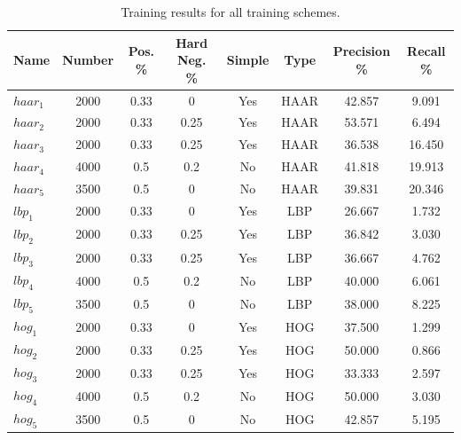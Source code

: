 \documentclass{llncs}
\begin{document}
{		\begin{table}
			\centering
			\caption{Training results for all training schemes.}
			\label{tab:training_results}
			\begin{tabularx}{\textwidth}{@{}lccccccc@{}}
				\toprule
				\textbf{Name} & \textbf{Number} & \textbf{Pos. \%} & \textbf{Hard Neg. \%} & \textbf{Simple} & \textbf{Type} & \textbf{Precision \%} & \textbf{Recall \%} \\
				\midrule
					\(haar_1\) & 2000 & 0.33 & 0     & Yes & HAAR & 42.857 &  9.091 \\
					\(haar_2\) & 2000 & 0.33 & 0.25  & Yes & HAAR & 53.571 &  6.494 \\
					\(haar_3\) & 2000 & 0.33 & 0.25  & Yes & HAAR & 36.538 & 16.450 \\
					\(haar_4\) & 4000 & 0.5  & 0.2   & No & HAAR & 41.818 & 19.913 \\
					\(haar_5\) & 3500 & 0.5  & 0     & No & HAAR & 39.831 & 20.346 \\
					\(lbp_1\)  & 2000 & 0.33 & 0     & Yes & LBP  & 26.667 &  1.732 \\
					\(lbp_2\)  & 2000 & 0.33 & 0.25  & Yes & LBP  & 36.842 &  3.030 \\
					\(lbp_3\)  & 2000 & 0.33 & 0.25  & Yes & LBP  & 36.667 &  4.762 \\
					\(lbp_4\)  & 4000 & 0.5  & 0.2   & No & LBP  & 40.000 &  6.061 \\
					\(lbp_5\)  & 3500 & 0.5  & 0     & No & LBP  & 38.000 &  8.225 \\
					\(hog_1\)  & 2000 & 0.33 & 0     & Yes & HOG  & 37.500 &  1.299 \\
					\(hog_2\)  & 2000 & 0.33 & 0.25  & Yes & HOG  & 50.000 &  0.866 \\
					\(hog_3\)  & 2000 & 0.33 & 0.25  & Yes & HOG  & 33.333 &  2.597 \\
					\(hog_4\)  & 4000 & 0.5  & 0.2   & No & HOG  & 50.000 &  3.030 \\
					\(hog_5\)  & 3500 & 0.5  & 0     & No & HOG  & 42.857 &  5.195 \\
				\bottomrule
			\end{tabularx}
		\end{table}

}
\end{document}
